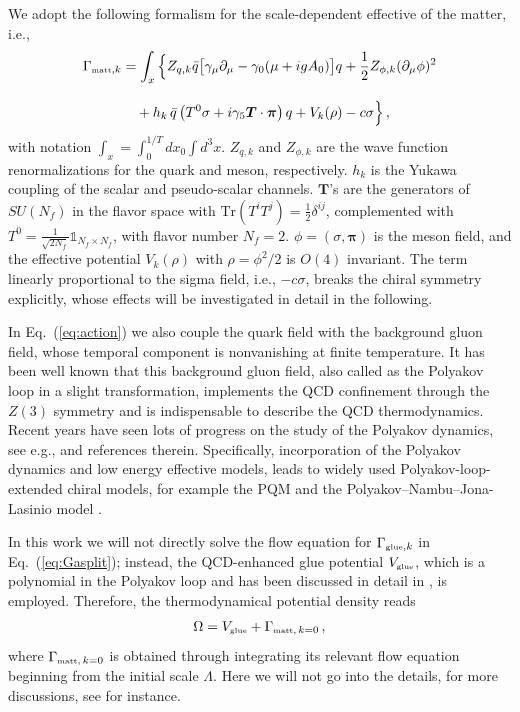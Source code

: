 \documentclass[final,5p,times,twocolumn,colorlinks=true,citecolor=blue,linkcolor=blue]{elsarticle}
\def\Eq#1{Eq.~(\ref{#1})}
\begin{document}
We adopt the following formalism for the scale-dependent effective of the matter, i.e.,
\begin{align} 
  \Gamma_{\text{\tiny{matt}},k}&=\int_{x}\Big\{Z_{q,k}\bar{q}\big[\gamma_{\mu}\partial_{\mu}-\gamma_{0}(\mu+igA_0)\big]q +\frac{1}{2}Z_{\phi,k}(\partial_{\mu}\phi)^2\nonumber\\[2ex]
  &\quad+h_{k} \,\bar{q}\left( T^{0}\sigma+i\gamma_{5} \bm{T}\cdot\bm{\pi}\right) q+V_{k}(\rho)-c\sigma\Big\}\,,\label{eq:action}
\end{align}
with notation $\int_{x}=\int_0^{1/T}d x_0 \int d^3 x$. $Z_{q,k}$ and $Z_{\phi,k}$ are the wave function renormalizations for the quark and meson, respectively. $h_{k}$ is the Yukawa coupling of the scalar and pseudo-scalar channels. $\bm{T}$'s are the generators of $SU(N_{f})$ in the flavor space with $\mathrm{Tr}(T^{i}T^{j})=\frac{1}{2}\delta^{ij}$, complemented with $T^{0}=\frac{1}{\sqrt{2N_{f}}}\mathbb{1}_{N_{f}\times N_{f}}$, with flavor number $N_{f}=2$.  $\phi=(\sigma,\bm{\pi})$ is the meson field, and the effective potential $V_{k}(\rho)$ with $\rho=\phi^2/2$ is $O(4)$ invariant. The term linearly proportional to the sigma field, i.e., $-c\sigma$, breaks the chiral symmetry explicitly, whose effects will be investigated in detail in the following.

In \Eq{eq:action} we also couple the quark field with the background gluon field, whose temporal component is nonvanishing at finite temperature. It has been well known that this background gluon field, also called as the Polyakov loop in a slight transformation, implements the QCD confinement through the $Z(3)$ symmetry and is indispensable to describe the QCD thermodynamics. Recent years have seen lots of progress on the study of the Polyakov dynamics, see e.g., \cite{Fukushima:2017csk} and references therein. Specifically, incorporation of the Polyakov dynamics and low energy effective models, leads to widely used Polyakov-loop-extended chiral models, for example the PQM \cite{Schaefer:2007pw} and the Polyakov--Nambu--Jona-Lasinio model \cite{Fukushima:2003fw,Ratti:2005jh,Fu:2007xc}.

In this work we will not directly solve the flow equation for $\Gamma_{\text{\tiny{glue}},k}$ in \Eq{eq:Gasplit}; instead, the QCD-enhanced glue potential $V_{\text{\tiny{glue}}}$, which is a polynomial in the Polyakov loop and has been discussed in detail in \cite{Fu:2015naa}, is employed. Therefore, the thermodynamical potential density reads
\begin{align}
  \Omega=V_{\text{\tiny{glue}}}+\Gamma_{\text{\tiny{matt}},\,k=0}\,,\label{}
\end{align}
where $\Gamma_{\text{\tiny{matt}},\,k=0}$ is obtained through integrating its relevant flow equation beginning from the initial scale $\Lambda$. Here we will not go into the details, for more discussions, see \cite{Fu:2015naa} for instance.
\end{document}
